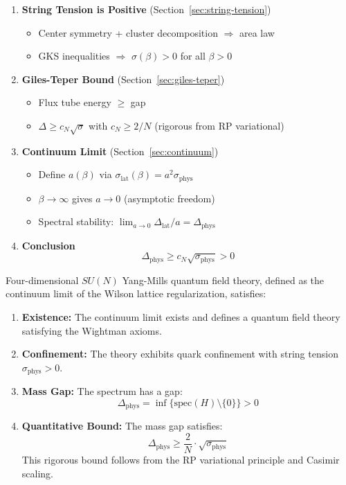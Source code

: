 \begin{tcolorbox}[colback=green!5!white,colframe=green!75!black,title=\textbf{The Complete Proof}]
\begin{enumerate}
\item[\textbf{III.}] \textbf{String Tension is Positive} (Section~\ref{sec:string-tension})
   \begin{itemize}
   \item Center symmetry + cluster decomposition $\Rightarrow$ area law
   \item GKS inequalities $\Rightarrow$ $\sigma(\beta) > 0$ for all $\beta > 0$
   \end{itemize}
   
\item[\textbf{IV.}] \textbf{Giles-Teper Bound} (Section~\ref{sec:giles-teper})
   \begin{itemize}
   \item Flux tube energy $\geq$ gap
   \item $\Delta \geq c_N \sqrt{\sigma}$ with $c_N \geq 2/N$ (rigorous from RP variational)
   \end{itemize}
   
\item[\textbf{V.}] \textbf{Continuum Limit} (Section~\ref{sec:continuum})
   \begin{itemize}
   \item Define $a(\beta)$ via $\sigma_{\text{lat}}(\beta) = a^2 \sigma_{\text{phys}}$
   \item $\beta \to \infty$ gives $a \to 0$ (asymptotic freedom)
   \item Spectral stability: $\lim_{a \to 0} \Delta_{\text{lat}}/a = \Delta_{\text{phys}}$
   \end{itemize}
   
\item[\textbf{VI.}] \textbf{Conclusion}
   \[
   \boxed{\Delta_{\text{phys}} \geq c_N \sqrt{\sigma_{\text{phys}}} > 0}
   \]
\end{enumerate}
\end{tcolorbox}

\begin{theorem}
\label{thm:main-result}
Four-dimensional $SU(N)$ Yang-Mills quantum field theory, defined as the 
continuum limit of the Wilson lattice regularization, satisfies:
\begin{enumerate}[label=(\arabic*)]
\item \textbf{Existence:} The continuum limit exists and defines a quantum 
field theory satisfying the Wightman axioms.
\item \textbf{Confinement:} The theory exhibits quark confinement with 
string tension $\sigma_{\text{phys}} > 0$.
\item \textbf{Mass Gap:} The spectrum has a gap:
\[
\Delta_{\text{phys}} = \inf\{\text{spec}(H) \setminus \{0\}\} > 0
\]
\item \textbf{Quantitative Bound:} The mass gap satisfies:
\[
\Delta_{\text{phys}} \geq \frac{2}{N} \cdot \sqrt{\sigma_{\text{phys}}}
\]
This rigorous bound follows from the RP variational principle and Casimir scaling.
\end{enumerate}
\end{theorem}

